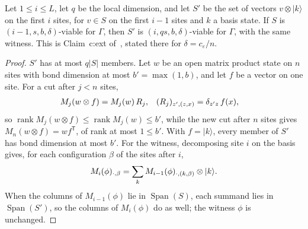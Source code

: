 \begin{lemma}
    \label{thm:lvv_viable_extension}
    \leanok
    Let $1\le i\le L$, let $q$ be the local dimension, and let $S'$ be the set
    of vectors $v\otimes|k\rangle$ on the first $i$ sites, for $v\in S$ on the
    first $i-1$ sites and $k$ a basis state. If $S$ is
    $(i-1,s,b,\delta)$-viable for $\Gamma$, then $S'$ is
    $(i,qs,b,\delta)$-viable for $\Gamma$, with the same witness. This is
    Claim~c:ext of~\cite[lines 379--400]{Landau2015Polynomial}, stated there
    for $\delta=c_\varepsilon/n$.
\end{lemma}

\begin{proof}
    \leanok
    $S'$ has at most $q|S|$ members. Let $w$ be an open matrix product state on
    $n$ sites with bond dimension at most $b'=\max(1,b)$, and let $f$ be a
    vector on one site. For a cut after $j<n$ sites,
    \begin{align}
        M_j(w\otimes f)  & =M_j(w)\,R_j,              &
        (R_j)_{z',(z,x)} & =\delta_{z'z}\,f(x),\notag
    \end{align}
    so $\operatorname{rank}M_j(w\otimes f)\le\operatorname{rank}M_j(w)\le b'$,
    while the new cut after $n$ sites gives $M_n(w\otimes f)=wf^{\mathsf T}$, of
    rank at most $1\le b'$. With $f=|k\rangle$, every member of $S'$ has bond
    dimension at most $b'$. For the witness, decomposing site $i$ on the basis
    gives, for each configuration $\beta$ of the sites after $i$,
    \begin{align}
        M_i(\phi)_{\cdot,\beta}=\sum_k M_{i-1}(\phi)_{\cdot,(k,\beta)}\otimes|k\rangle.\notag
    \end{align}
    When the columns of $M_{i-1}(\phi)$ lie in $\operatorname{Span}(S)$, each
    summand lies in $\operatorname{Span}(S')$, so the columns of $M_i(\phi)$ do as
    well; the witness $\phi$ is unchanged.
\end{proof}

